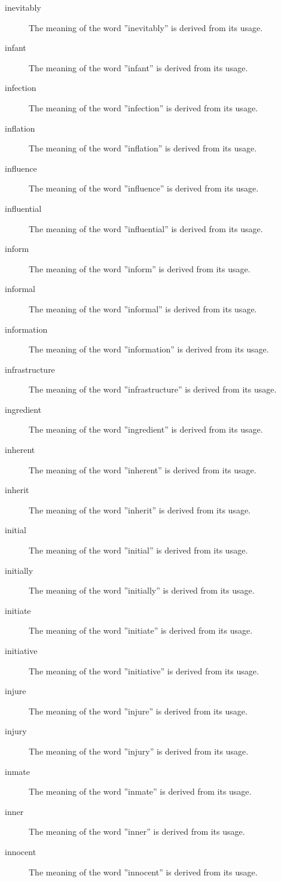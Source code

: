 \documentclass[12pt, letterpaper]{memoir}
\begin{document}
\begin{description}
\item[inevitably] The meaning of the word ''inevitably'' is derived from its usage.
\item[infant] The meaning of the word ''infant'' is derived from its usage.
\item[infection] The meaning of the word ''infection'' is derived from its usage.
\item[inflation] The meaning of the word ''inflation'' is derived from its usage.
\item[influence] The meaning of the word ''influence'' is derived from its usage.
\item[influential] The meaning of the word ''influential'' is derived from its usage.
\item[inform] The meaning of the word ''inform'' is derived from its usage.
\item[informal] The meaning of the word ''informal'' is derived from its usage.
\item[information] The meaning of the word ''information'' is derived from its usage.
\item[infrastructure] The meaning of the word ''infrastructure'' is derived from its usage.
\item[ingredient] The meaning of the word ''ingredient'' is derived from its usage.
\item[inherent] The meaning of the word ''inherent'' is derived from its usage.
\item[inherit] The meaning of the word ''inherit'' is derived from its usage.
\item[initial] The meaning of the word ''initial'' is derived from its usage.
\item[initially] The meaning of the word ''initially'' is derived from its usage.
\item[initiate] The meaning of the word ''initiate'' is derived from its usage.
\item[initiative] The meaning of the word ''initiative'' is derived from its usage.
\item[injure] The meaning of the word ''injure'' is derived from its usage.
\item[injury] The meaning of the word ''injury'' is derived from its usage.
\item[inmate] The meaning of the word ''inmate'' is derived from its usage.
\item[inner] The meaning of the word ''inner'' is derived from its usage.
\item[innocent] The meaning of the word ''innocent'' is derived from its usage.

\end{description}
\end{document}
